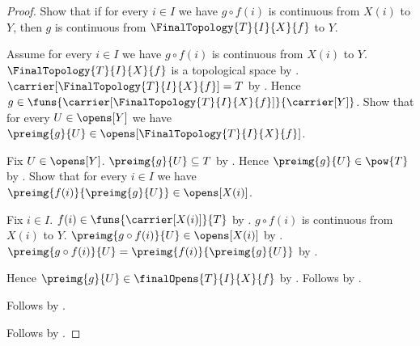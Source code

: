 \begin{proof}
    Show that if for every $i\in I$ we have
        $g\circ f(i)$ is continuous from $X(i)$ to $Y$, then
        $g$ is continuous from $\FinalTopology{T}{I}{X}{f}$ to $Y$.
    \begin{subproof}
        Assume for every $i\in I$ we have
            $g\circ f(i)$ is continuous from $X(i)$ to $Y$.
        $\FinalTopology{T}{I}{X}{f}$ is a topological space by
            .
        $\carrier[\FinalTopology{T}{I}{X}{f}]=T$ by
            .
        Hence $g\in\funs{\carrier[\FinalTopology{T}{I}{X}{f}]}
            {\carrier[Y]}$.
        Show that for every $U\in\opens[Y]$ we have
            $\preimg{g}{U}\in\opens[\FinalTopology{T}{I}{X}{f}]$.
        \begin{subproof}
            Fix $U\in\opens[Y]$.
            $\preimg{g}{U}\subseteq T$ by
                .
            Hence $\preimg{g}{U}\in\pow{T}$ by .
            Show that for every $i\in I$ we have
                $\preimg{f(i)}{\preimg{g}{U}}\in\opens[X(i)]$.
            \begin{subproof}
                Fix $i\in I$.
                $f(i)\in\funs{\carrier[X(i)]}{T}$ by
                    .
                $g\circ f(i)$ is continuous from $X(i)$ to $Y$.
                $\preimg{g\circ f(i)}{U}\in\opens[X(i)]$ by
                    .
                $\preimg{g\circ f(i)}{U}
                    =\preimg{f(i)}{\preimg{g}{U}}$ by
                    .
            \end{subproof}
            Hence $\preimg{g}{U}\in\finalOpens{T}{I}{X}{f}$ by
                .
            Follows by .
        \end{subproof}
        Follows by .
    \end{subproof}
    Follows by \auto.
\end{proof}

